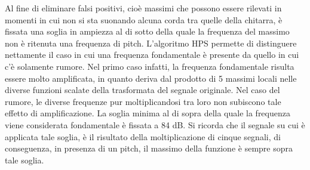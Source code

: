 Al fine di eliminare falsi positivi, cioè massimi che possono essere rilevati in momenti in cui non si sta suonando alcuna corda tra quelle della chitarra, è fissata una soglia in ampiezza al di sotto della quale la frequenza del massimo non è ritenuta una frequenza di pitch.
L'algoritmo \mbox{HPS} permette di distinguere nettamente il caso in cui una frequenza fondamentale è presente da quello in cui c'è solamente rumore.
Nel primo caso infatti, la frequenza fondamentale risulta essere molto amplificata, in quanto deriva dal prodotto di 5 massimi locali nelle diverse funzioni scalate della trasformata del segnale originale.
Nel caso del rumore, le diverse frequenze pur moltiplicandosi tra loro non subiscono tale effetto di amplificazione.
La soglia minima al di sopra della quale la frequenza viene considerata fondamentale è fissata a 84 dB.
Si ricorda che il segnale su cui è applicata tale soglia, è il risultato della moltiplicazione di cinque segnali, di conseguenza, in presenza di un pitch, il massimo della funzione è sempre sopra tale soglia.


